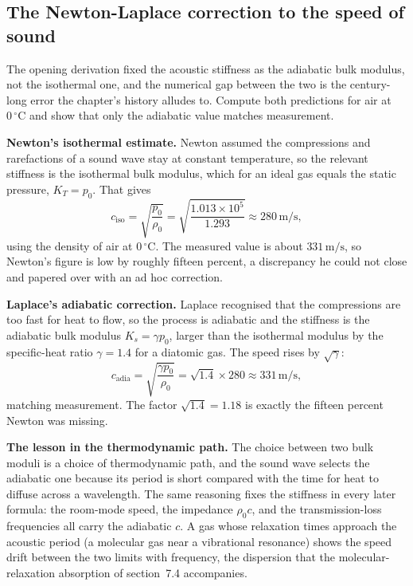 \subsection{The Newton-Laplace correction to the speed of sound}

The opening derivation fixed the acoustic stiffness as the adiabatic bulk
modulus, not the isothermal one, and the numerical gap between the two is
the century-long error the chapter's history alludes to. Compute both
predictions for air at $0\,{}^{\circ}\mathrm{C}$ and show that only the
adiabatic value matches measurement.

\textbf{Newton's isothermal estimate.} Newton assumed the compressions and
rarefactions of a sound wave stay at constant temperature, so the relevant
stiffness is the isothermal bulk modulus, which for an ideal gas equals the
static pressure, $K_T = p_0$. That gives
\[
c_{\text{iso}} = \sqrt{\frac{p_0}{\rho_0}}
             = \sqrt{\frac{1.013\times 10^5}{1.293}}
             \approx 280\,\si{\meter\per\second} ,
\]
using the density of air at $0\,{}^{\circ}\mathrm{C}$. The measured value is
about $331\,\si{\meter\per\second}$, so Newton's figure is low by roughly
fifteen percent, a discrepancy he could not close and papered over with an
ad hoc correction.

\textbf{Laplace's adiabatic correction.} Laplace recognised that the
compressions are too fast for heat to flow, so the process is adiabatic and
the stiffness is the adiabatic bulk modulus $K_s = \gamma p_0$, larger than
the isothermal modulus by the specific-heat ratio $\gamma = 1.4$ for a
diatomic gas. The speed rises by $\sqrt\gamma$:
\[
c_{\text{adia}} = \sqrt{\frac{\gamma p_0}{\rho_0}}
              = \sqrt{1.4}\times 280
              \approx 331\,\si{\meter\per\second} ,
\]
matching measurement. The factor $\sqrt{1.4}=1.18$ is exactly the fifteen
percent Newton was missing.

\textbf{The lesson in the thermodynamic path.} The choice between two bulk
moduli is a choice of thermodynamic path, and the sound wave selects the
adiabatic one because its period is short compared with the time for heat to
diffuse across a wavelength. The same reasoning fixes the stiffness in every
later formula: the room-mode speed, the impedance $\rho_0 c$, and the
transmission-loss frequencies all carry the adiabatic $c$. A gas whose
relaxation times approach the acoustic period (a molecular gas near a
vibrational resonance) shows the speed drift between the two limits with
frequency, the dispersion that the molecular-relaxation absorption of
section~7.4 accompanies.

